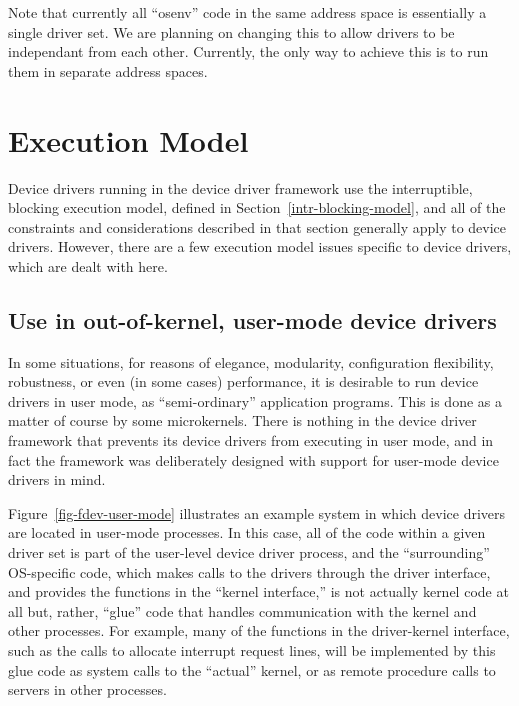 Note that currently all ``osenv'' code in the same address space is
essentially a single driver set.  We are planning on changing
this to allow drivers to be independant from each other.
Currently, the only way to achieve this is to run them in
separate address spaces.


\section{Execution Model}

Device drivers running in the \oskit{} device driver framework
use the interruptible, blocking execution model,
defined in Section~\ref{intr-blocking-model},
and all of the constraints and considerations
described in that section generally apply to \oskit{} device drivers.
However,
there are a few execution model issues specific to device drivers,
which are dealt with here.

\subsection{Use in out-of-kernel, user-mode device drivers}
\label{fdev-user-mode-sec}

In some situations, for reasons of
elegance, modularity, configuration flexibility, robustness,
or even (in some cases) performance,
it is desirable to run device drivers in user mode,
as ``semi-ordinary'' application programs.
This is done as a matter of course
by some microkernels.
There is nothing in the \oskit{} device driver framework
that prevents its device drivers from executing in user mode,
and in fact the framework was deliberately designed
with support for user-mode device drivers in mind.


Figure~\ref{fig-fdev-user-mode} illustrates an example system
in which device drivers are located in user-mode processes.
In this case, all of the code within a given driver set
is part of the user-level device driver process,
and the ``surrounding'' OS-specific code,
which makes calls to the drivers through the driver interface,
and provides the functions in the ``kernel interface,''
is not actually kernel code at all
but, rather, ``glue'' code that handles communication
with the kernel and other processes.
For example, many of the functions in the driver-kernel interface,
such as the calls to allocate interrupt request lines,
will be implemented by this glue code
as system calls to the ``actual'' kernel,
or as remote procedure calls to servers in other processes.

